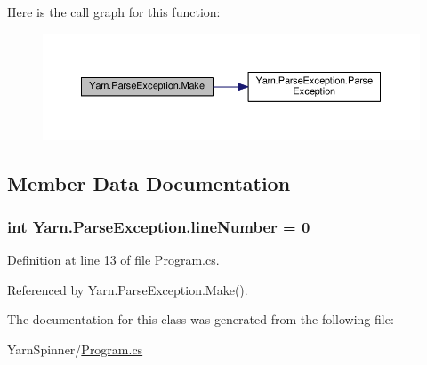 Here is the call graph for this function\-:
\nopagebreak
\begin{figure}[H]
\begin{center}
\leavevmode
\includegraphics[width=350pt]{a00137_a0265905b09fbd675d40c452d9fc61207_cgraph}
\end{center}
\end{figure}




\subsection{Member Data Documentation}
\hypertarget{a00137_ab335169367e64fd6d89d58b3ac573751}{
\subsubsection[{line\-Number}]{\setlength{\rightskip}{0pt plus 5cm}int Yarn.\-Parse\-Exception.\-line\-Number = 0\hspace{0.3cm}{\ttfamily [package]}}}\label{a00137_ab335169367e64fd6d89d58b3ac573751}


Definition at line 13 of file Program.\-cs.



Referenced by Yarn.\-Parse\-Exception.\-Make().



The documentation for this class was generated from the following file\-:\begin{DoxyCompactItemize}
\item 
Yarn\-Spinner/\hyperlink{a00296}{Program.\-cs}\end{DoxyCompactItemize}
